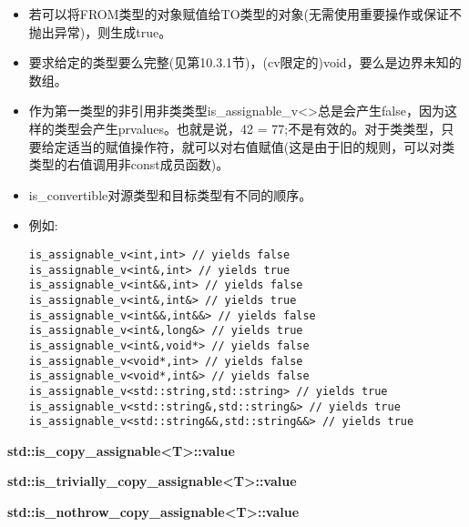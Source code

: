 \begin{itemize}
\item
若可以将FROM类型的对象赋值给TO类型的对象(无需使用重要操作或保证不抛出异常)，则生成true。

\item
要求给定的类型要么完整(见第10.3.1节)，(cv限定的)void，要么是边界未知的数组。

\item
作为第一类型的非引用非类类型is\_assignable\_v<>总是会产生false，因为这样的类型会产生prvalues。也就是说，42 = 77;不是有效的。对于类类型，只要给定适当的赋值操作符，就可以对右值赋值(这是由于旧的规则，可以对类类型的右值调用非const成员函数)。

\item
is\_convertible对源类型和目标类型有不同的顺序。

\item
例如:
\begin{lstlisting}[style=styleCXX]
is_assignable_v<int,int> // yields false
is_assignable_v<int&,int> // yields true
is_assignable_v<int&&,int> // yields false
is_assignable_v<int&,int&> // yields true
is_assignable_v<int&&,int&&> // yields false
is_assignable_v<int&,long&> // yields true
is_assignable_v<int&,void*> // yields false
is_assignable_v<void*,int> // yields false
is_assignable_v<void*,int&> // yields false
is_assignable_v<std::string,std::string> // yields true
is_assignable_v<std::string&,std::string&> // yields true
is_assignable_v<std::string&&,std::string&&> // yields true
\end{lstlisting}
\end{itemize}

\textbf{std::is\_copy\_assignable<T>::value}

\textbf{std::is\_trivially\_copy\_assignable<T>::value}

\textbf{std::is\_nothrow\_copy\_assignable<T>::value}

